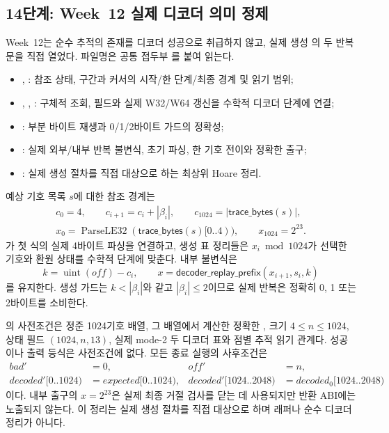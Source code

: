 \subsection{14단계: Week~12 실제 디코더 의미 정제}

Week~12는 순수 추적의 존재를 디코더 성공으로 취급하지 않고, 실제 생성
의 두 반복문을 직접 열었다. 파일명은
공통 접두부 를 붙여 읽는다.
\begin{itemize}
  \item {}, : 참조 상태,
        구간과 커서의 시작/한 단계/최종 경계 및 읽기 범위;
  \item {}, ,
        : 구체적  조회,
         필드와 실제 W32/W64 갱신을 수학적 디코더
        단계에 연결;
  \item {}: 부분 바이트 재생과 0/1/2바이트
        가드의 정확성;
  \item {}: 실제 외부/내부 반복 불변식, 초기 파싱,
        한 기호 전이와 정확한 출구;
  \item {}: 실제 생성 절차를 직접 대상으로 하는 최상위
        Hoare 정리.
\end{itemize}

예상 기호 목록 \(s\)에 대한 참조 경계는
\[
\begin{gathered}
 c_0=4,\qquad c_{i+1}=c_i+|\beta_i|,\qquad
 c_{1024}=|\mathsf{trace\_bytes}(s)|,\\
 x_0=\operatorname{ParseLE32}(\mathsf{trace\_bytes}(s)[0..4)),\qquad
 x_{1024}=2^{23}.
\end{gathered}
\]
가 첫 식의 실제 4바이트
파싱을 연결하고, 생성 표 정리들은 \(x_i\bmod1024\)가 선택한 기호와 환원
상태를 수학적 단계에 맞춘다. 내부 불변식은
\[
 k=\operatorname{uint}(off)-c_i,\qquad
 x=\mathsf{decoder\_replay\_prefix}(x_{i+1},s_i,k)
\]
를 유지한다. 생성 가드는 \(k<|\beta_i|\)와 같고
\(|\beta_i|\le2\)이므로 실제 반복은 정확히 0, 1 또는 2바이트를 소비한다.

\begin{verified}
\label{thm:actual-decoder-trace-closure}
의 사전조건은 정준
1024기호 배열, 그 배열에서 계산한 정확한 , 크기
\(4\le n\le1024\), 상태 필드 \((1024,n,13)\), 실제 mode-2 두 디코더 표와
점별 추적 읽기 관계다. 성공이나 출력 등식은 사전조건에 없다. 모든 종료
실행의 사후조건은
\[
\begin{aligned}
  bad'&=0,& off'&=n,\\
  decoded'[0..1024)&=expected[0..1024),&
  decoded'[1024..2048)&=decoded_0[1024..2048)
\end{aligned}
\]
이다. 내부 출구의 \(x=2^{23}\)은 실제 최종 거절 검사를 닫는 데 사용되지만
반환 ABI에는 노출되지 않는다. 이 정리는 실제 생성 절차를 직접 대상으로 하며
래퍼나 순수 디코더 정리가 아니다.
\end{verified}

